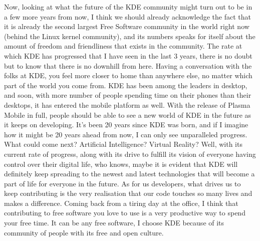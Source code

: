 Now, looking at what the future of the KDE community might turn out to be in a few more years from now, I think we should already acknowledge the fact that it is already the second largest Free Software community in the world right now (behind the Linux kernel community), and its numbers speaks for itself about the amount of freedom and friendliness that exists in the community. The rate at which KDE has progressed that I have seen in the last 3 years, there is no doubt but to know that there is no downhill from here. Having a conversation with the folks at KDE, you feel more closer to home than anywhere else, no matter which part of the world you come from. KDE has been among the leaders in desktop, and soon, with more number of people spending time on their phones than their desktops, it has entered the mobile platform as well. With the release of Plasma Mobile in full, people should be able to see a new world of KDE in the future as it keeps on developing. It's been 20 years since KDE was born, and if I imagine how it might be 20 years ahead from now, I can only see unparalleled progress. What could come next? Artificial Intelligence? Virtual Reality? Well, with its current rate of progress, along with its drive to fulfill its vision of everyone having control over their digital life, who knows, maybe it is evident that KDE will definitely keep spreading to the newest and latest technologies that will become a part of life for everyone in the future. As for us developers, what drives us to keep contributing is the very realisation that our code touches so many lives and makes a difference. Coming back from a tiring day at the office, I think that contributing to free software you love to use is a very productive way to spend your free time. It can be any free software, I choose KDE because of its community of people with its free and open culture.